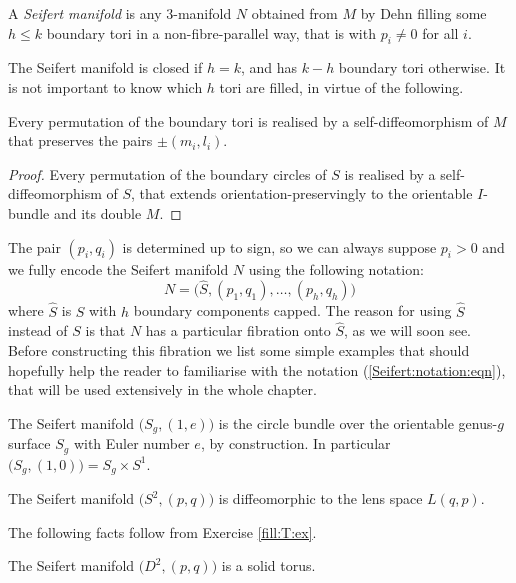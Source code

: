 \begin{defn}
A \emph{Seifert manifold} is any 3-manifold $N$ obtained from $M$ by Dehn filling some $h\leqslant k$ boundary tori in a non-fibre-parallel way, that is with $p_i\neq 0$ for all $i$. 
\end{defn}

The Seifert manifold is closed if $h=k$, and has $k-h$ boundary tori otherwise. It is not important to know which $h$ tori are filled, in virtue of the following.

\begin{prop}
Every permutation of the boundary tori is realised by a self-diffeomorphism of $M$ that preserves the pairs $\pm (m_i,l_i)$.
\end{prop}
\begin{proof}
Every permutation of the boundary circles of $S$ is realised by a self-diffeomorphism of $S$, that extends orientation-preservingly to the orientable $I$-bundle and its double $M$.
\end{proof}

The pair $(p_i,q_i)$ is determined up to sign, so we can always suppose $p_i>0$ and we fully encode the Seifert manifold $N$ using the following notation: 
\begin{equation} \label{Seifert:notation:eqn}
N = \big(\hat S, (p_1,q_1), \ldots, (p_h, q_h)\big)
\end{equation}
where $\hat S$ is $S$ with $h$ boundary components capped. The reason for using $\hat S$ instead of $S$ is that $N$ has a particular fibration onto $\hat S$, as we will soon see. Before constructing this fibration we list some simple examples that should hopefully help the reader to familiarise with the notation (\ref{Seifert:notation:eqn}), that will be used extensively in the whole chapter.

\begin{example}
The Seifert manifold $\big(S_g,(1,e)\big)$ is the circle bundle over the orientable genus-$g$ surface $S_g$ with Euler number $e$, by construction. In particular $\big(S_g,(1,0)\big) = S_g \times S^1$.
\end{example}

\begin{example}
The Seifert manifold $\big( S^2, (p,q) \big)$ is diffeomorphic to the lens space $L(q,p)$.
\end{example}

The following facts follow from Exercise \ref{fill:T:ex}.

\begin{ex} \label{solid:ex}
The Seifert manifold $\big(D^2, (p,q)\big)$ is a solid torus.
\end{ex}


